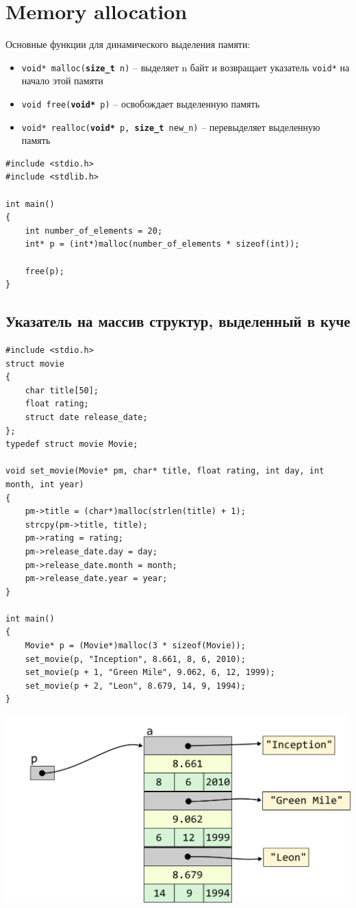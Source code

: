 \documentclass{article}
\begin{document}
\section*{Memory allocation}
Основные функции для динамического выделения памяти:
\begin{itemize}
\item \texttt{void* malloc(\textbf{size\_t} n)} -- выделяет n байт и возвращает указатель \texttt{void*}
на начало этой памяти \\
\item \texttt{void free(\textbf{void*} p)} -- освобождает выделенную память\\
\item \texttt{void* realloc(\textbf{void*} p, \textbf{size\_t} new\_n)} -- перевыделяет выделенную память\\
\end{itemize}
\begin{lstlisting}
#include <stdio.h>
#include <stdlib.h>

int main()
{
	int number_of_elements = 20;
	int* p = (int*)malloc(number_of_elements * sizeof(int)); 

	free(p);
}
\end{lstlisting}

\subsection*{Указатель на массив структур, выделенный в куче}
\begin{lstlisting}
#include <stdio.h>
struct movie
{
	char title[50];
	float rating;
	struct date release_date;
};
typedef struct movie Movie;

void set_movie(Movie* pm, char* title, float rating, int day, int month, int year)
{
	pm->title = (char*)malloc(strlen(title) + 1);
	strcpy(pm->title, title);
	pm->rating = rating;
	pm->release_date.day = day;
	pm->release_date.month = month;
	pm->release_date.year = year;
}

int main()
{
	Movie* p = (Movie*)malloc(3 * sizeof(Movie));
	set_movie(p, "Inception", 8.661, 8, 6, 2010);
	set_movie(p + 1, "Green Mile", 9.062, 6, 12, 1999);
	set_movie(p + 2, "Leon", 8.679, 14, 9, 1994);
}
\end{lstlisting}
\begin{center}
\includegraphics[scale=1]{../../images/pointer_schemes/pointer_to_array_of_struct_movie_charpointers.png}
\end{center}
\end{document}

